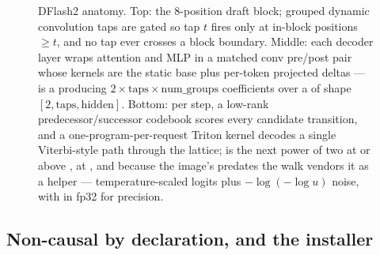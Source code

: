 \begin{figure}[htbp]
{}
\caption{DFlash2 anatomy. Top: the 8-position draft block; grouped dynamic
convolution taps are gated so tap $t$ fires only at in-block positions
$\geq t$, and no tap ever crosses a block boundary. Middle: each decoder
layer wraps attention and MLP in a matched conv pre/post pair whose kernels
are the static base plus per-token projected deltas ---
 is a  producing
$2 \times \mathrm{taps} \times \mathrm{num\_groups}$ coefficients over a
 of shape $[2, \mathrm{taps}, \mathrm{hidden}]$. Bottom:
per step, a low-rank predecessor/successor codebook scores every candidate
transition, and a one-program-per-request Triton kernel decodes a single
Viterbi-style path through the lattice;  is the next power of
two at or above , at , and because the
image's  predates  the walk
vendors it as a  helper --- temperature-scaled logits
plus $-\log(-\log u)$ noise, with  in fp32 for precision.}
\label{fig:dflash2-anatomy}
\end{figure}

\subsection{Non-causal by declaration, and the installer}

